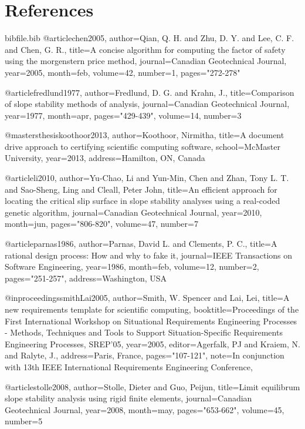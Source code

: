 \documentclass[12pt]{article}
\begin{document}
\section{References}
\label{Sec:References}
\begin{filecontents*}{bibfile.bib}
@article{chen2005,
author={Qian, Q. H. and Zhu, D. Y. and Lee, C. F. and Chen, G. R.},
title={A concise algorithm for computing the factor of safety using the morgenstern price method},
journal={Canadian Geotechnical Journal},
year={2005},
month={feb},
volume={42},
number={1},
pages={"272-278"}}

@article{fredlund1977,
author={Fredlund, D. G. and Krahn, J.},
title={Comparison of slope stability methods of analysis},
journal={Canadian Geotechnical Journal},
year={1977},
month={apr},
pages={"429-439"},
volume={14},
number={3}}

@mastersthesis{koothoor2013,
author={Koothoor, Nirmitha},
title={A document drive approach to certifying scientific computing software},
school={McMaster University},
year={2013},
address={Hamilton, ON, Canada}}

@article{li2010,
author={Yu-Chao, Li and Yun-Min, Chen and Zhan, Tony L. T. and Sao-Sheng, Ling and Cleall, Peter John},
title={An efficient approach for locating the critical slip surface in slope stability analyses using a real-coded genetic algorithm},
journal={Canadian Geotechnical Journal},
year={2010},
month={jun},
pages={"806-820"},
volume={47},
number={7}}

@article{parnas1986,
author={Parnas, David L. and Clements, P. C.},
title={A rational design process: How and why to fake it},
journal={IEEE Transactions on Software Engineering},
year={1986},
month={feb},
volume={12},
number={2},
pages={"251-257"},
address={Washington, USA}}

@inproceedings{smithLai2005,
author={Smith, W. Spencer and Lai, Lei},
title={A new requirements template for scientific computing},
booktitle={Proceedings of the First International Workshop on Situational Requirements Engineering Processes - Methods, Techniques and Tools to Support Situation-Specific Requirements Engineering Processes, SREP'05},
year={2005},
editor={Agerfalk, PJ and Kraiem, N. and Ralyte, J.},
address={Paris, France},
pages={"107-121"},
note={In conjunction with 13th IEEE International Requirements Engineering Conference,}}

@article{stolle2008,
author={Stolle, Dieter and Guo, Peijun},
title={Limit equilibrum slope stability analysis using rigid finite elements},
journal={Canadian Geotechnical Journal},
year={2008},
month={may},
pages={"653-662"},
volume={45},
number={5}}
\end{filecontents*}
\nocite{*}
\printbibliography[heading=none]
\end{document}

